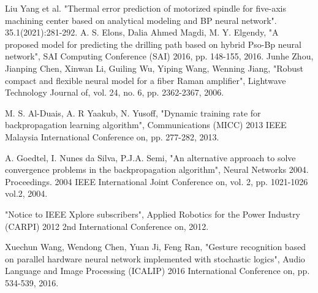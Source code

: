 \documentclass[12pt]{article}  %
\begin{document}
\begin{thebibliography}{99}
 Liu Yang et al. "Thermal error prediction of motorized spindle for five-axis machining center based on analytical modeling and BP neural network". 35.1(2021):281-292.
 A. S. Elons, Dalia Ahmed Magdi, M. Y. Elgendy, "A proposed model for predicting the drilling path based on hybrid Pso-Bp neural network", SAI Computing Conference (SAI) 2016, pp. 148-155, 2016.
 Junhe Zhou, Jianping Chen, Xinwan Li, Guiling Wu, Yiping Wang, Wenning Jiang, "Robust compact and flexible neural model for a fiber Raman amplifier", Lightwave Technology Journal of, vol. 24, no. 6, pp. 2362-2367, 2006.

 M. S. Al-Duais, A. R Yaakub, N. Yusoff, "Dynamic training rate for backpropagation learning algorithm", Communications (MICC) 2013 IEEE Malaysia International Conference on, pp. 277-282, 2013.


 A. Goedtel, I. Nunes da Silva, P.J.A. Semi, "An alternative approach to solve convergence problems in the backpropagation algorithm", Neural Networks 2004. Proceedings. 2004 IEEE International Joint Conference on, vol. 2, pp. 1021-1026 vol.2, 2004.



 "Notice to IEEE Xplore subscribers", Applied Robotics for the Power Industry (CARPI) 2012 2nd International Conference on, 2012.

 Xuechun Wang, Wendong Chen, Yuan Ji, Feng Ran, "Gesture recognition based on parallel hardware neural network implemented with stochastic logics", Audio Language and Image Processing (ICALIP) 2016 International Conference on, pp. 534-539, 2016.



\end{thebibliography}
\end{document}
